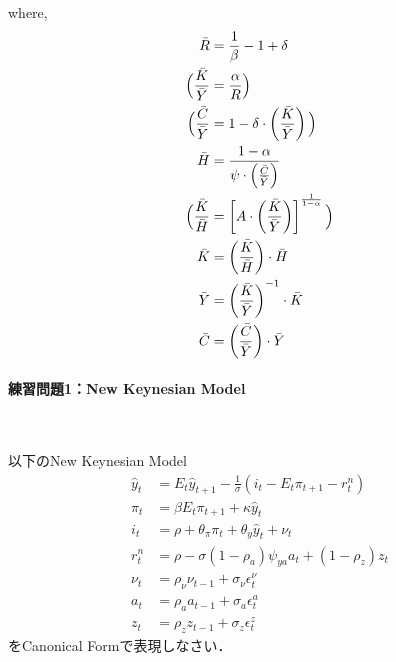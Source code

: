 \documentclass[a4j, dvipdfmx]{jarticle}
\begin{document}
where,
\begin{align}
\bar R &= \frac{1}{\beta}-1+\delta\\
\Big(\frac{\bar K}{\bar Y} &= \frac{\alpha}{R}\Big)\notag\\
\Big(\frac{\bar C}{\bar Y} &= 1-\delta\cdot\left(\frac{\bar K}{\bar Y}\right)\Big)\notag\\
\bar H &= \frac{1-\alpha}{\psi\cdot\left(\frac{\bar C}{\bar Y}\right)}\\
\Big(\frac{\bar K}{\bar H} &= \left[A\cdot\left(\frac{\bar K}{\bar Y}\right)\right]^{\frac{1}{1-\alpha}}\Big)\notag\\
\bar K &= \left(\frac{\bar K}{\bar H}\right)\cdot \bar H\\
\bar Y &= \left(\frac{\bar K}{\bar Y}\right)^{-1}\cdot \bar K\\
\bar C &= \left(\frac{\bar C}{\bar Y}\right) \cdot \bar Y
\end{align}


\paragraph{練習問題1：New Keynesian Model}~

以下のNew Keynesian Model
\begin{align}
\hat{y}_t &= E_t \hat{y}_{t+1} -\frac{1}{\sigma} (i_t - E_t\pi_{t+1} - r^n_t) \\
\pi_t &= \beta E_t\pi_{t+1} + \kappa \hat{y}_t\\
i_t &= \rho + \theta_\pi \pi_t + \theta_y \hat{y}_t + \nu_t \\
r^n_t &= \rho - \sigma (1-\rho_a) \psi_{ya} a_t +(1-\rho_z)z_t\\
\nu_t &= \rho_\nu \nu_{t-1} + \sigma_\nu \epsilon^\nu_t\\
a_t &= \rho_a a_{t-1} + \sigma_a \epsilon^a_t\\
z_t &= \rho_z z_{t-1} + \sigma_z \epsilon^z_t
\end{align}
をCanonical Formで表現しなさい．
\end{document}
